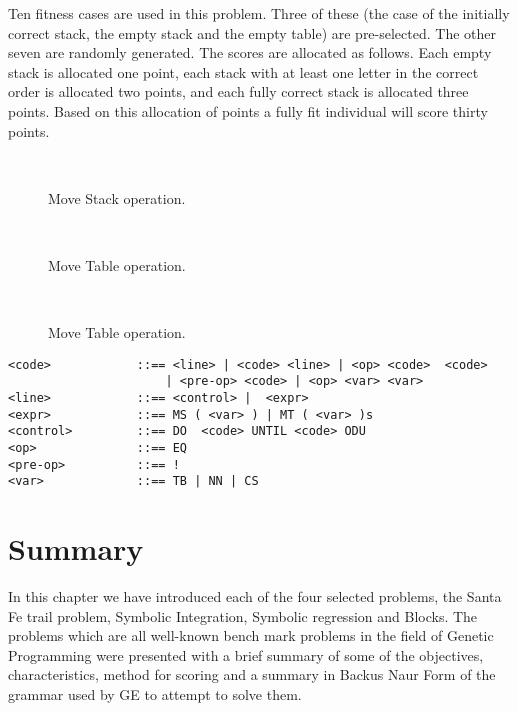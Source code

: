 \label{blocks_scores}Ten fitness cases are used in this problem. Three of these (the case of the initially correct stack, the empty stack and the empty table) are pre-selected. The other seven are randomly generated. The scores are allocated as follows. Each empty stack is allocated one point, each stack with at least one letter in the correct order is allocated two points, and each fully correct stack is allocated three points. Based on this allocation of points a fully fit individual will score thirty points. 



\begin{figure}[]
\centerline{\hbox{
}}
\caption{\label{blocks2} Move Stack operation.}
\end{figure}


\begin{figure}[]
\centerline{\hbox{
}}
\caption{\label{blocks3} Move Table operation.}
\end{figure}


\begin{figure}[]
\centerline{\hbox{
}}
\caption{\label{blocks4} Move Table operation.}
\end{figure}


\small
\begin{verbatim}
<code>            ::== <line> | <code> <line> | <op> <code>  <code>
                      | <pre-op> <code> | <op> <var> <var>
<line>            ::== <control> |  <expr> 
<expr>            ::== MS ( <var> ) | MT ( <var> )s
<control>         ::== DO  <code> UNTIL <code> ODU
<op>              ::== EQ 
<pre-op>          ::== !
<var>             ::== TB | NN | CS
\end{verbatim}
\normalsize


\section{Summary}
In this chapter we have introduced each of the four selected problems, the Santa Fe trail problem, Symbolic Integration, Symbolic regression and Blocks. The problems which are all well-known bench mark problems in the field of Genetic Programming were presented with a brief summary of some of the objectives, characteristics, method for scoring  and a summary in Backus Naur Form of the grammar used by GE to attempt to solve them.























